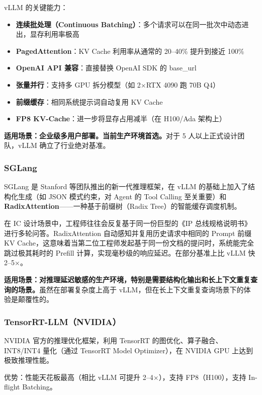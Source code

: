 \documentclass[UTF8,a4paper,10pt,oneside]{ctexart}
\begin{document}
vLLM 的关键能力：
\begin{itemize}
    \item \textbf{连续批处理（Continuous Batching）}：多个请求可以在同一批次中动态进出，显存利用率极高
    \item \textbf{PagedAttention}：KV Cache 利用率从通常的 20--40\% 提升到接近 100\%
    \item \textbf{OpenAI API 兼容}：直接替换 OpenAI SDK 的 base\_url
    \item \textbf{张量并行}：支持多 GPU 拆分模型（如 2$\times$RTX 4090 跑 70B Q4）
    \item \textbf{前缀缓存}：相同系统提示词自动复用 KV Cache
    \item \textbf{FP8 KV-Cache}：进一步将显存占用减半（在 H100/Ada 架构上）
\end{itemize}

\textbf{适用场景：企业级多用户部署。当前生产环境首选。}对于 5 人以上正式设计团队，vLLM 确立了行业绝对基准。

\subsubsection{SGLang}

SGLang 是 Stanford 等团队推出的新一代推理框架，在 vLLM 的基础上加入了结构化生成（如 JSON 模式约束，对 Agent 的 Tool Calling 至关重要）和 \textbf{RadixAttention}——一种基于前缀树（Radix Tree）的智能缓存调度机制。

在 IC 设计场景中，工程师往往会反复基于同一份巨型的《IP 总线规格说明书》进行多轮问答。RadixAttention 自动感知并复用历史请求中相同的 Prompt 前缀 KV Cache，这意味着当第二位工程师发起基于同一份文档的提问时，系统能完全跳过极其耗时的 Prefill 计算，实现毫秒级的响应延迟。在部分基准上比 vLLM 快 2--5$\times$。

\textbf{适用场景：对推理延迟敏感的生产环境，特别是需要结构化输出和长上下文重复查询的场景。}虽然在部署复杂度上高于 vLLM，但在长上下文重复查询场景下的体验是颠覆性的。

\subsubsection{TensorRT-LLM（NVIDIA）}

NVIDIA 官方的推理优化框架，利用 TensorRT 的图优化、算子融合、INT8/INT4 量化（通过 TensorRT Model Optimizer），在 NVIDIA GPU 上达到极致推理性能。

优势：性能天花板最高（相比 vLLM 可提升 2--4$\times$），支持 FP8（H100），支持 In-flight Batching。
\end{document}
